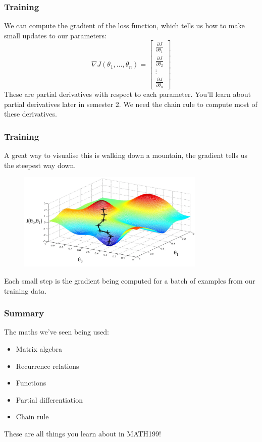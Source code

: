 \documentclass{beamer}
\begin{document}
\begin{frame}
    \frametitle{Training}
    We can compute the \alert{gradient} of the loss function, which tells us how to make small updates to our parameters:
    \[\nabla J(\theta_1,... , \theta_n) = \begin{bmatrix}
            \frac{\partial J}{\partial \theta_1} \\[6pt]
            \frac{\partial J}{\partial \theta_2} \\[6pt]
            \vdots                               \\[6pt]
            \frac{\partial J}{\partial \theta_n}
        \end{bmatrix}\]
    These are partial derivatives with respect to each parameter. You'll learn about partial derivatives later in semester 2. We need the chain rule to compute most of these derivatives. 
\end{frame}

\begin{frame}
    \frametitle{Training}
    A great way to visualise this is walking down a mountain, the gradient tells us the steepest way down.
    \begin{figure}
        \centering
        \includegraphics[width=0.8\textwidth]{images/gradient-descent.png}
    \end{figure}
    Each small step is the gradient being computed for a batch of examples from our training data. 
\end{frame}

\begin{frame}
    \frametitle{Summary}
    The maths we've seen being used:
    \begin{itemize}
        \item Matrix algebra
        \item Recurrence relations
        \item Functions
        \item Partial differentiation
        \item Chain rule
    \end{itemize}
    \vspace{0.5cm}
    These are all things you learn about in MATH199!
\end{frame}
\end{document}
